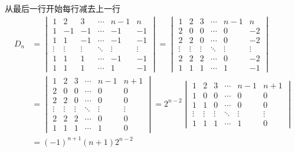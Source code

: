\begin{solution}
    从最后一行开始每行减去上一行
    \begin{align*}
        D_n&=\begin{vmatrix}
            1 & 2 & 3 & \cdots & n-1 & n \\
            1 & -1 & -1 & \cdots & -1 & -1 \\
            1 & 1 & -1 & \cdots & -1 & -1 \\
            \vdots & \vdots & \vdots & \ddots & \vdots & \vdots \\
            1 & 1 & 1 & \cdots & -1 & -1\\
            1 & 1 & 1 & \cdots & 1 & -1
        \end{vmatrix}=\begin{vmatrix}
            1 & 2 & 3 & \cdots & n-1 & n \\
            2 & 0 & 0 & \cdots & 0 & -2 \\
            2 & 2 & 0 & \cdots & 0 & -2 \\
            \vdots & \vdots & \vdots & \ddots & \vdots & \vdots \\
            2 & 2 & 2 & \cdots & 0 & -2 \\
            1 & 1 & 1 & \cdots & 1 & -1
        \end{vmatrix} \\
        &=\begin{vmatrix}
            1 & 2 & 3 & \cdots & n-1 & n+1 \\
            2 & 0 & 0 & \cdots & 0 & 0 \\
            2 & 2 & 0 & \cdots & 0 & 0 \\
            \vdots & \vdots & \vdots & \ddots & \vdots & \vdots \\
            2 & 2 & 2 & \cdots & 0 & 0 \\
            1 & 1 & 1 & \cdots & 1 & 0
        \end{vmatrix}=2^{n-2}
        \begin{vmatrix}
            1 & 2 & 3 & \cdots & n-1 & n+1 \\
            1 & 0 & 0 & \cdots & 0 & 0 \\
            1 & 1 & 0 & \cdots & 0 & 0 \\
            \vdots & \vdots & \vdots & \ddots & \vdots & \vdots \\
            1 & 1 & 1 & \cdots & 1 & 0
        \end{vmatrix}\\
        &=(-1)^{n+1}(n+1) 2^{n-2}
    \end{align*}
\end{solution}

